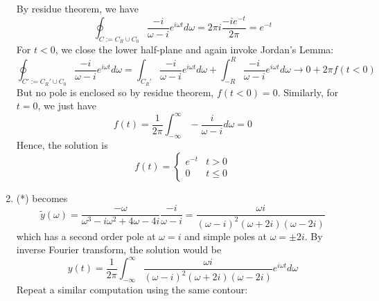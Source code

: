 \documentclass[a4paper]{article}
\begin{document}
\begin{ans}
\begin{enumerate}[label=(\alph*)]
\begin{center}
\begin{tikzpicture}
    \end{tikzpicture}
  \end{center}
  By residue theorem, we have
  $$\oint_{C:=C_R\cup C_0}\frac{-i}{\omega-i}e^{i\omega t}d\omega=2\pi i\frac{-ie^{-t}}{2\pi}=e^{-t}$$
  For $t<0$, we close the lower half-plane and again invoke Jordan's Lemma:
  $$\oint_{C':=C_R'\cup C_0}\frac{-i}{\omega-i}e^{i\omega t}d\omega=\int_{C_R'}\frac{-i}{\omega-i}e^{i\omega t}d\omega+\int_{-R}^R\frac{-i}{\omega-i}e^{i\omega t}d\omega\rightarrow 0+2\pi f(t<0)$$
  But no pole is enclosed so by residue theorem, $f(t<0)=0$. Similarly, for $t=0$, we just have
  $$f(t)=\frac{1}{2\pi}\int_{-\infty}^\infty-\frac{i}{\omega -i}d\omega=0$$
  Hence, the solution is
  $$f(t)=
\left\{
        \begin{array}{ll}
      e^{-t} & t>0 \\
      0 & t\leq0
        \end{array}
    \right.$$
\item (*) becomes
$$\tilde{y}(\omega)=\frac{-\omega}{\omega^3-i\omega^2+4\omega-4i}\frac{-i}{\omega-i}=\frac{\omega i}{(\omega-i)^2(\omega+2i)(\omega-2i)}$$
which has a second order pole at $\omega=i$ and simple poles at $\omega=\pm 2i$. By inverse Fourier transform, the solution would be
$$y(t)=\frac{1}{2\pi}\int_{-\infty}^\infty\frac{\omega i}{(\omega-i)^2(\omega+2i)(\omega-2i)}e^{i\omega t}d\omega$$
Repeat a similar computation using the same contour:
\begin{center}
\end{center}
\end{enumerate}
\end{ans}
\end{document}
